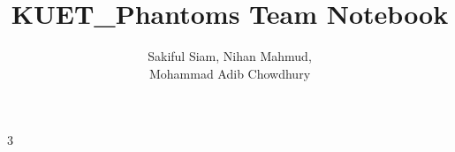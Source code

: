 \documentclass[8pt, a4paper, onesided]{article}
\title{\vspace{-2.5ex}KUET\_Phantoms Team Notebook}
\author{Sakiful Siam, Nihan Mahmud,\\Mohammad Adib Chowdhury}
\date{}
\begin{document}
\begin{landscape}
\begin{multicols*}{3}

\maketitle
\vspace{-7ex}
\tableofcontents
\pagestyle{fancy}
 
\raggedbottom


\begingroup
\setlength{\parskip}{0.2ex}
\setlength{\parindent}{0pt}


\endgroup
\end{multicols*}

\end{landscape}
\end{document}
